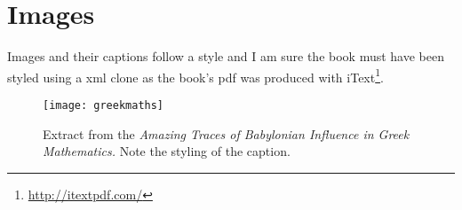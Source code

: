 \section{Images}
\indent Images and their captions follow a \latexe style and I am sure the book must have been styled using a \latexe xml clone as the book's pdf was produced with iText\footnote{\url{http://itextpdf.com/}}.

\begin{figure}[ht]
\centering
\texttt{[image: greekmaths]}
\caption{Extract from the \textit{Amazing Traces of Babylonian Influence in Greek Mathematics.} Note the styling of the caption.}
\end{figure}

\testsections


